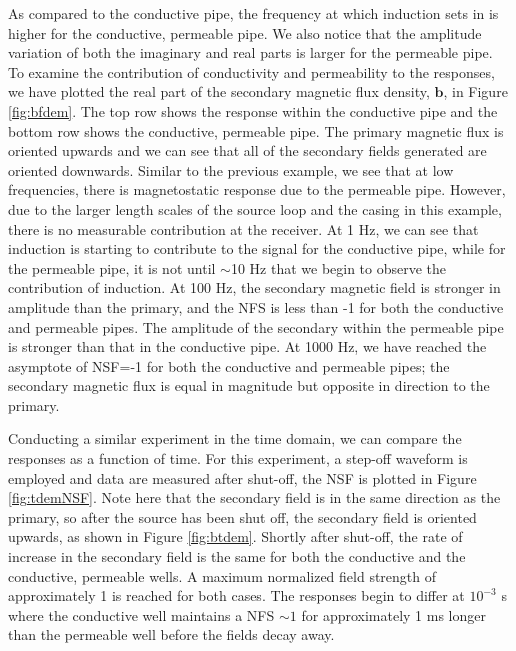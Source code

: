 \documentclass[preprint,review,3p,times,onecolumn,authoryear]{elsarticle}
\begin{document}
As compared to the conductive pipe, the frequency at which induction sets in is higher for the conductive, permeable pipe. We also notice that the amplitude variation of both the imaginary and real parts is larger for the permeable pipe. To examine the contribution of conductivity and permeability to the responses, we have plotted the real part of the secondary magnetic flux density, $\mathbf{b}$, in Figure \ref{fig:bfdem}. The top row shows the response within the conductive pipe and the bottom row shows the conductive, permeable pipe. The primary magnetic flux is oriented upwards and we can see that all of the secondary fields generated are oriented downwards. Similar to the previous example, we see that at low frequencies, there is magnetostatic response due to the permeable pipe. However, due to the larger length scales of the source loop and the casing in this example, there is no measurable contribution at the receiver. At 1 Hz, we can see that induction is starting to contribute to the signal for the conductive pipe, while for the permeable pipe, it is not until $\sim$10 Hz that we begin to observe the contribution of induction. At 100 Hz, the secondary magnetic field is stronger in amplitude than the primary, and the NFS is less than -1 for both the conductive and permeable pipes. The amplitude of the secondary within the permeable pipe is stronger than that in the conductive pipe. At 1000 Hz, we have reached the asymptote of NSF=-1 for both the conductive and permeable pipes; the secondary magnetic flux is equal in magnitude but opposite in direction to the primary.







Conducting a similar experiment in the time domain, we can compare the responses as a function of time. For this experiment, a step-off waveform is employed and data are measured after shut-off, the NSF is plotted in Figure \ref{fig:tdemNSF}. Note here that the secondary field is in the same direction as the primary, so after the source has been shut off, the secondary field is oriented upwards, as shown in Figure \ref{fig:btdem}. Shortly after shut-off, the rate of increase in the secondary field is the same for both the conductive and the conductive, permeable wells. A maximum normalized field strength of approximately 1 is reached for both cases. The responses begin to differ at $10^{-3}$ s where the conductive well maintains a NFS $\sim 1$ for approximately 1 ms longer than the permeable well before the fields decay away.
\end{document}
